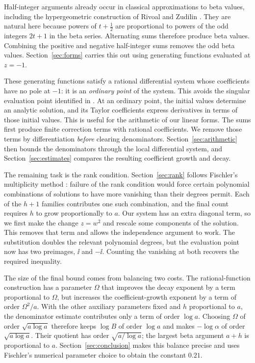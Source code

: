 Half-integer arguments already occur in classical approximations to beta
values, including the hypergeometric construction of
Rivoal and Zudilin \cite[Section~2]{RZ03}.
They are natural here because powers of $t+\tfrac12$ are proportional to
powers of the odd integers $2t+1$ in the beta series. Alternating sums
therefore produce beta values. Combining the positive and negative
half-integer sums removes the odd beta values.
Section~\ref{sec:forms} carries this out using generating functions
evaluated at $z=-1$.

These generating functions satisfy a rational differential system whose
coefficients have no pole at $-1$: it is an \emph{ordinary point} of the
system. This avoids the singular evaluation point identified in
\cite[Section~2]{M25}. At an ordinary point, the initial values determine
an analytic solution, and its Taylor coefficients express derivatives
in terms of those initial values. This is useful for the arithmetic of
our linear forms. The sums first produce finite correction terms with
rational coefficients. We remove those terms by differentiation
\emph{before} clearing denominators. Section~\ref{sec:arithmetic} then
bounds the denominators through the local differential system, and
Section~\ref{sec:estimates} compares the resulting coefficient growth
and decay.

The remaining task is the rank condition. Section~\ref{sec:rank} follows
Fischler's multiplicity method \cite[Section~4.5]{F26}: failure of the
rank condition would force certain polynomial combinations of solutions
to have more vanishing than their degrees permit. Each of the $h+1$
families contributes one such combination, and the final count requires
$h$ to grow proportionally to $a$. Our system has an extra diagonal
term, so we first make the change $z=w^2$ and rescale
some components of the solution. This removes that term and allows the
independence argument to work. The substitution doubles the relevant
polynomial degrees, but the evaluation point now has two preimages,
$\ii$ and $-\ii$. Counting the vanishing at both recovers the required
inequality.

The size of the final bound comes from balancing two costs. The
rational-function construction has a parameter $\Omega$ that improves
the decay exponent by a term proportional to $\Omega$, but increases
the coefficient-growth exponent by a term of order $\Omega^2/a$.
With the other auxiliary parameters fixed and $h$ proportional to $a$,
the denominator estimate contributes only a term of order $\log a$.
Choosing $\Omega$ of order
$\sqrt{a\log a}$ therefore keeps $\log B$ of order $\log a$ and
makes $-\log\alpha$ of order $\sqrt{a\log a}$.
Their quotient has order $\sqrt{a/\log a}$; the largest beta argument
$a+h$ is proportional to $a$. Section~\ref{sec:conclusion} makes this
balance precise and uses Fischler's numerical parameter choice to
obtain the constant $0.21$.

